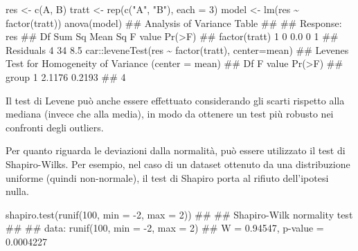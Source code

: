 \documentclass[a4paper,12pt,oneside]{book}
\newenvironment{Shaded}{\begin{snugshade}}{\end{snugshade}}
\newcommand{\DecValTok}[1]{#1}
\newcommand{\SpecialCharTok}[1]{#1}
\newcommand{\StringTok}[1]{#1}
\newcommand{\DocumentationTok}[1]{#1}
\newcommand{\OtherTok}[1]{#1}
\newcommand{\FunctionTok}[1]{#1}
\newcommand{\AttributeTok}[1]{#1}
\newcommand{\NormalTok}[1]{#1}
\begin{document}
\begin{Shaded}
\begin{Highlighting}[]
\NormalTok{res }\OtherTok{\textless{}{-}} \FunctionTok{c}\NormalTok{(A, B)}
\NormalTok{tratt }\OtherTok{\textless{}{-}} \FunctionTok{rep}\NormalTok{(}\FunctionTok{c}\NormalTok{(}\StringTok{"A"}\NormalTok{, }\StringTok{"B"}\NormalTok{), }\AttributeTok{each =} \DecValTok{3}\NormalTok{)}
\NormalTok{model }\OtherTok{\textless{}{-}} \FunctionTok{lm}\NormalTok{(res }\SpecialCharTok{\textasciitilde{}} \FunctionTok{factor}\NormalTok{(tratt))}
\FunctionTok{anova}\NormalTok{(model)}
\DocumentationTok{\#\# Analysis of Variance Table}
\DocumentationTok{\#\# }
\DocumentationTok{\#\# Response: res}
\DocumentationTok{\#\#               Df Sum Sq Mean Sq F value Pr(\textgreater{}F)}
\DocumentationTok{\#\# factor(tratt)  1      0     0.0       0      1}
\DocumentationTok{\#\# Residuals      4     34     8.5}
\NormalTok{car}\SpecialCharTok{::}\FunctionTok{leveneTest}\NormalTok{(res }\SpecialCharTok{\textasciitilde{}} \FunctionTok{factor}\NormalTok{(tratt), }\AttributeTok{center=}\NormalTok{mean)}
\DocumentationTok{\#\# Levene\textquotesingle{}s Test for Homogeneity of Variance (center = mean)}
\DocumentationTok{\#\#       Df F value Pr(\textgreater{}F)}
\DocumentationTok{\#\# group  1  2.1176 0.2193}
\DocumentationTok{\#\#        4}
\end{Highlighting}
\end{Shaded}

Il test di Levene può anche essere effettuato considerando gli scarti rispetto alla mediana (invece che alla media), in modo da ottenere un test più robusto nei confronti degli outliers.

Per quanto riguarda le deviazioni dalla normalità, può essere utilizzato il test di Shapiro-Wilks. Per esempio, nel caso di un dataset ottenuto da una distribuzione uniforme (quindi non-normale), il test di Shapiro porta al rifiuto dell'ipotesi nulla.

\begin{Shaded}
\begin{Highlighting}[]
\FunctionTok{shapiro.test}\NormalTok{(}\FunctionTok{runif}\NormalTok{(}\DecValTok{100}\NormalTok{, }\AttributeTok{min =} \SpecialCharTok{{-}}\DecValTok{2}\NormalTok{, }\AttributeTok{max =} \DecValTok{2}\NormalTok{))}
\DocumentationTok{\#\# }
\DocumentationTok{\#\#  Shapiro{-}Wilk normality test}
\DocumentationTok{\#\# }
\DocumentationTok{\#\# data:  runif(100, min = {-}2, max = 2)}
\DocumentationTok{\#\# W = 0.94547, p{-}value = 0.0004227}
\end{Highlighting}
\end{Shaded}
\end{document}
